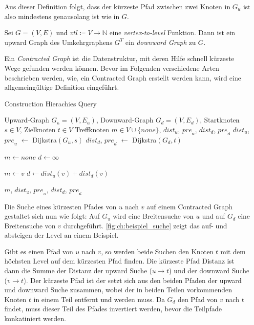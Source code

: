 Aus dieser Definition folgt, dass der kürzeste Pfad zwischen zwei Knoten in $G_u$ ist also mindestens genausolang ist wie in $G$.


\begin{definition}
    Sei $G = (V, E)$ und ${vtl} \coloneq V \to \mathbb{N}$ eine \emph{vertex-to-level} Funktion. Dann ist ein upward Graph des Umkehrgraphens $G^T$ ein \emph{downward Graph} zu $G$.
\end{definition}

Ein \emph{Contracted Graph} ist die Datenstruktur, mit deren Hilfe schnell kürzeste Wege gefunden werden können.
Bevor im Folgenden verschiedene Arten beschrieben werden, wie, ein Contracted Graph erstellt werden kann, wird eine allgemeingültige Definition eingeführt.

\begin{algorithm}
    \caption{Construction Hierachies Query}
    \begin{algorithmic}[1]
        \Require Upward-Graph $G_u = (V, E_u)$, Downward-Graph $G_d = (V, E_d)$, Startknoten $s \in V$, Zielknoten $t \in V$
        \Ensure Treffknoten $m \in V \cup \{ {none} \}$, ${dist}_u$, ${pre}_u$, ${dist}_d$, ${pre}_d$
        \State ${dist}_u$, ${pre}_u$ $\leftarrow$ Dijkstra$(G_u, s)$
        \State ${dist}_d$, ${pre}_d$ $\leftarrow$ Dijkstra$(G_d, t)$

        \State
        \State $m \leftarrow {none}$
        \State $d \leftarrow \infty$
        \State

        \State $m \leftarrow v$
        \State $d \leftarrow {dist}_u(v) + {dist}_d(v)$
        \EndIf
        \EndFor

        \State
        \State \Return $m$, ${dist}_u$, ${pre}_u$, ${dist}_d$, ${pre}_d$
    \end{algorithmic}
\end{algorithm}


Die Suche eines kürzesten Pfades von $u$ nach $v$ auf einem Contracted Graph gestaltet sich nun wie folgt:
Auf $G_u$ wird eine Breitensuche von $u$ und auf $G_d$ eine Breitensuche von $v$ durchgeführt.
\autoref{fig:ch:beispiel_suche} zeigt das auf- und absteigen der Level an einem Beispiel.

Gibt es einen Pfad von $u$ nach $v$, so werden beide Suchen den Knoten $t$ mit dem höchsten Level auf dem kürzesten Pfad finden.
Die kürzeste Pfad Distanz ist dann die Summe der Distanz der upward Suche ($u \to t$) und der downward Suche ($v \to t$).
Der kürzeste Pfad ist der setzt sich aus den beiden Pfaden der upward und downward Suche zusammen, wobei der in beiden Teilen vorkommenden Knoten $t$ in einem Teil entfernt und werden muss.
Da $G_d$ den Pfad von $v$ nach $t$ findet, muss dieser Teil des Pfades invertiert werden, bevor die Teilpfade konkatiniert werden.

